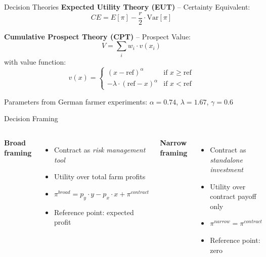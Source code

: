 \documentclass[aspectratio=169,12pt]{beamer}
\begin{document}
\begin{frame}{Decision Theories}
\textbf{Expected Utility Theory (EUT)} -- Certainty Equivalent:
\begin{equation*}
CE = E[\pi] - \frac{r}{2} \cdot \text{Var}[\pi]
\end{equation*}

\vspace{0.5em}
\textbf{Cumulative Prospect Theory (CPT)} -- Prospect Value:
\begin{equation*}
V = \sum_{i} w_i \cdot v(x_i)
\end{equation*}
with value function:
\begin{equation*}
v(x) = \begin{cases}
(x - \text{ref})^{\alpha} & \text{if } x \geq \text{ref} \\
-\lambda \cdot (\text{ref} - x)^{\alpha} & \text{if } x < \text{ref}
\end{cases}
\end{equation*}

\vspace{0.3em}
\small Parameters from German farmer experiments: $\alpha = 0.74$, $\lambda = 1.67$, $\gamma = 0.6$
\end{frame}

\begin{frame}{Decision Framing}
\begin{columns}[T]
\textbf{Broad framing}
\begin{itemize}
    \item Contract as \textit{risk management tool}
    \item Utility over total farm profits
    \item $\pi^{broad} = p_y \cdot y - p_x \cdot x + \pi^{contract}$
    \item Reference point: expected profit
\end{itemize}

\textbf{Narrow framing}
\begin{itemize}
    \item Contract as \textit{standalone investment}
    \item Utility over contract payoff only
    \item $\pi^{narrow} = \pi^{contract}$
    \item Reference point: zero
\end{itemize}
\end{columns}
\end{frame}
\end{document}
